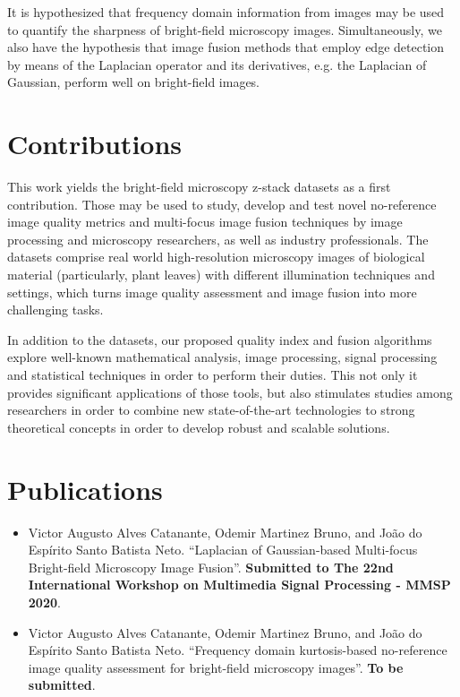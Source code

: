 It is hypothesized that frequency domain information from images may be used to quantify the sharpness of bright-field microscopy images. Simultaneously, we also have the hypothesis that image fusion methods that employ edge detection by means of the Laplacian operator and its derivatives, e.g. the Laplacian of Gaussian, perform well on bright-field images. 

\section{Contributions}

This work yields the bright-field microscopy z-stack datasets as a first contribution. Those may be used to study, develop and test novel no-reference image quality metrics and multi-focus image fusion techniques by image processing and microscopy researchers, as well as industry professionals. The datasets comprise real world high-resolution microscopy images of biological material (particularly, plant leaves) with different illumination techniques and settings, which turns image quality assessment and image fusion into more challenging tasks.

In addition to the datasets, our proposed quality index and fusion algorithms explore well-known mathematical analysis, image processing, signal processing and statistical techniques in order to perform their duties. This not only it provides significant applications of those tools, but also stimulates studies among researchers in order to combine new state-of-the-art technologies to strong theoretical concepts in order to develop robust and scalable solutions.

\section*{Publications}

\begin{itemize}
    \item Victor Augusto Alves Catanante, Odemir Martinez Bruno, and João do Espírito Santo Batista Neto. ``Laplacian of Gaussian-based Multi-focus Bright-field Microscopy Image Fusion''. \textbf{Submitted to The 22nd International Workshop on Multimedia Signal Processing - MMSP 2020}.
    
    \item \cite{catanante2020frequency} Victor Augusto Alves Catanante, Odemir Martinez Bruno, and João do Espírito Santo Batista Neto. ``Frequency domain kurtosis-based no-reference image quality assessment for bright-field microscopy images''. \textbf{To be submitted}.
\end{itemize}

